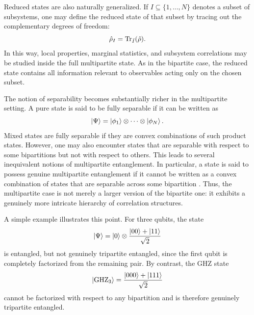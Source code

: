 Reduced states are also naturally generalized. If \(I\subseteq \{1,\dots,N\}\) denotes a subset of subsystems, one may define the reduced state of that subset by tracing out the complementary degrees of freedom:
\begin{equation}
	\hat \rho_I=\Tr_{\bar I}(\hat \rho).
	\label{eq:intro_qm_reduced_state_subset}
\end{equation}
In this way, local properties, marginal statistics, and subsystem correlations may be studied inside the full multipartite state. As in the bipartite case, the reduced state contains all information relevant to observables acting only on the chosen subset.

The notion of separability becomes substantially richer in the multipartite setting. A pure state is said to be fully separable if it can be written as
\begin{equation}
	\ket{\Psi}
	=
	\ket{\phi_1}\otimes\cdots\otimes\ket{\phi_N}.
	\label{eq:intro_qm_fully_separable_pure_state}
\end{equation}
Mixed states are fully separable if they are convex combinations of such product states. However, one may also encounter states that are separable with respect to some bipartitions but not with respect to others. This leads to several inequivalent notions of multipartite entanglement. In particular, a state is said to possess genuine multipartite entanglement if it cannot be written as a convex combination of states that are separable across some bipartition \cite{Horodecki3_09,GuhneToth09}. Thus, the multipartite case is not merely a larger version of the bipartite one: it exhibits a genuinely more intricate hierarchy of correlation structures.

A simple example illustrates this point. For three qubits, the state
\begin{equation}
	\ket{\Psi}=\ket{0}\otimes\frac{\ket{00}+\ket{11}}{\sqrt{2}}
	\label{eq:intro_qm_three_qubit_biseparable_example}
\end{equation}
is entangled, but not genuinely tripartite entangled, since the first qubit is completely factorized from the remaining pair. By contrast, the GHZ state
\begin{equation}
	\ket{\mathrm{GHZ}_3}
	=
	\frac{\ket{000}+\ket{111}}{\sqrt{2}}
	\label{eq:intro_qm_ghz_state_definition}
\end{equation}
cannot be factorized with respect to any bipartition and is therefore genuinely tripartite entangled.

